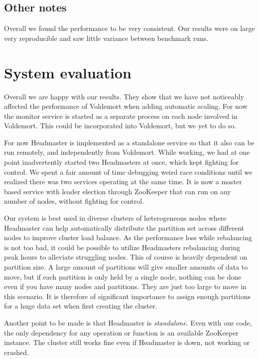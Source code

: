 \subsection{Other notes}
Overall we found the performance to be very consistent. Our results were on large very reproducible and saw little variance between benchmark runs.


\section{System evaluation}
\label{eval:discussion}
Overall we are happy with our results. They show that we have not noticeably affected the performance of Voldemort when adding automatic scaling. For now the monitor service is started as a separate process on each node involved in Voldemort. This could be incorporated into Voldemort, but we yet to do so.  

For now Headmaster is implemented as a standalone service so that it also can be run remotely, and independently from Voldemort.
While working, we had at one point inadvertently started two Headmasters at once, which kept fighting for control.
We spent a fair amount of time debugging weird race conditions until we realized there was two services operating at the same time.
It is now a master based service with leader election through ZooKeeper that can run on any number of nodes, without fighting for control.

Our system is best used in diverse clusters of heterogeneous nodes where Headmaster can help automatically distribute the partition set across different nodes to improve cluster load balance. As the performance loss while rebalancing is not too bad, it could be possible to utilize Headmasters rebalancing during peak hours to alleviate struggling nodes. This of course is heavily dependent on partition size. A large amount of partitions will give smaller amounts of data to move, but if each partition is only held by a single node, nothing can be done even if you have many nodes and partitions. They are just too large to move in this scenario. It is therefore of significant importance to assign enough partitions for a huge data set when first creating the cluster.

Another point to be made is that Headmaster is \emph{standalone}. Even with our code, the only dependency for any operation or function is an available ZooKeeper instance. The cluster still works fine even if Headmaster is down, not working or crashed.

